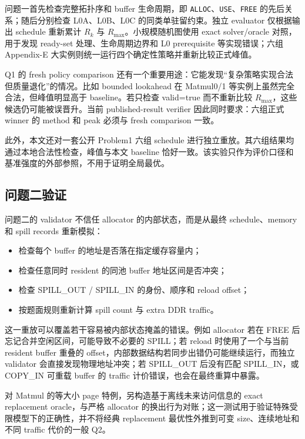 问题一首先检查完整拓扑序和 buffer 生命周期，即 \texttt{ALLOC}、\texttt{USE}、\texttt{FREE} 的先后关系；随后分别检查 L0A、L0B、L0C 的同类单驻留约束。独立 evaluator 仅根据输出 schedule 重新累计 $R_k$ 与 $R_{\max}$。小规模随机图使用 exact solver/oracle 对照，用于发现 ready-set 处理、生命周期边界和 L0 prerequisite 等实现错误；六组 Appendix-E 大实例则统一运行四个确定性策略并重新比较正式峰值。

Q1 的 fresh policy comparison 还有一个重要用途：它能发现“复杂策略实现合法但质量退化”的情况。比如 bounded lookahead 在 Matmul0/1 等实例上虽然完全合法，但峰值明显高于 baseline。若只检查 valid=true 而不重新比较 $R_{\max}$，这些候选仍可能被误晋升。当前 published-result verifier 因此同时要求：六组正式 winner 的 method 和 peak 必须与 fresh comparison 一致。

此外，本文还对一套公开 Problem1 六组 schedule 进行独立重放。其六组结果均通过本地合法性检查，峰值与本文 baseline 恰好一致。该实验只作为评价口径和基准强度的外部参照，不用于证明全局最优。

\subsection{问题二验证}

问题二的 validator 不信任 allocator 的内部状态，而是从最终 schedule、memory 和 spill records 重新模拟：
\begin{itemize}
    \item 检查每个 buffer 的地址是否落在指定缓存容量内；
    \item 检查任意同时 resident 的同池 buffer 地址区间是否冲突；
    \item 检查 SPILL\_OUT / SPILL\_IN 的身份、顺序和 reload offset；
    \item 按题面规则重新计算 spill count 与 extra DDR traffic。
\end{itemize}

这一重放可以覆盖若干容易被内部状态掩盖的错误。例如 allocator 若在 FREE 后忘记合并空闲区间，可能导致不必要的 SPILL；若 reload 时使用了一个与当前 resident buffer 重叠的 offset，内部数据结构若同步出错仍可能继续运行，而独立 validator 会直接发现物理地址冲突；若 SPILL\_OUT 后没有匹配 SPILL\_IN，或 COPY\_IN 可重载 buffer 的 traffic 计价错误，也会在最终重算中暴露。

对 Matmul 的等大小 page 特例，另构造基于离线未来访问信息的 exact replacement oracle，与严格 allocator 的换出行为对账；这一测试用于验证特殊受限模型下的正确性，并不将经典 replacement 最优性外推到可变 size、连续地址和不同 traffic 代价的一般 Q2。

